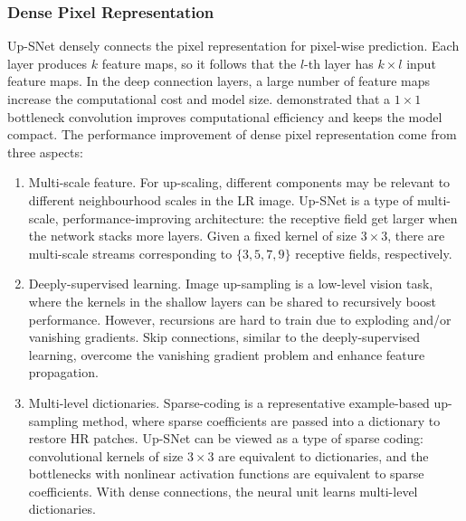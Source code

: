 \documentclass[runningheads]{llncs}
\begin{document}
\subsubsection{Dense Pixel Representation}
Up-SNet densely connects the pixel representation \cite{densenet} for pixel-wise prediction. Each layer produces $k$ feature maps, so it follows that the $l$-th layer has $k\times l$ input feature maps. In the deep connection layers, a large number of feature maps increase the computational cost and model size. \cite{reception} demonstrated that a $1 \times 1$ bottleneck convolution improves computational efficiency and keeps the model compact. The performance improvement of dense pixel representation come from three aspects:
\begin{enumerate}[(1)]
  \item Multi-scale feature. For up-scaling, different components may be relevant to different neighbourhood scales in the LR image. Up-SNet is a type of multi-scale, performance-improving architecture: the receptive field get larger when the network stacks more layers. Given a fixed kernel of size $3\times3$, there are multi-scale streams corresponding to $\{3, 5, 7, 9\}$ receptive fields, respectively.
  \item Deeply-supervised learning. Image up-sampling is a low-level vision task, where the kernels in the shallow layers can be shared to recursively boost performance. However, recursions are hard to train due to exploding and/or vanishing gradients. Skip connections, similar to the deeply-supervised learning, overcome the vanishing gradient problem and enhance feature propagation.
  \item Multi-level dictionaries. Sparse-coding is a representative example-based up-sampling method, where sparse coefficients are passed into a dictionary to restore HR patches. Up-SNet can be viewed as a type of sparse coding: convolutional kernels of size $3\times3$ are equivalent to dictionaries, and the bottlenecks with nonlinear activation functions are equivalent to sparse coefficients. With dense connections, the neural unit learns multi-level dictionaries. %
\end{enumerate}
\end{document}
